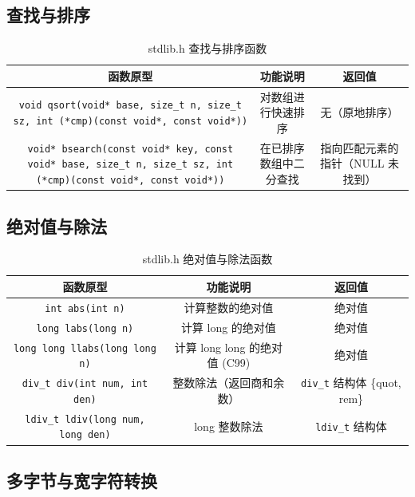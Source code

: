 \subsection{查找与排序}

\begin{table}[H]
\centering
\small
\renewcommand{\arraystretch}{1.6}
\begin{tabulary}{\linewidth}{CCC}
\toprule
\textbf{函数原型} & \textbf{功能说明} & \textbf{返回值} \\ \midrule
\texttt{void qsort(void* base, size\_t n, size\_t sz, int (*cmp)(const void*, const void*))} & 对数组进行快速排序 & 无（原地排序） \\ 
\texttt{void* bsearch(const void* key, const void* base, size\_t n, size\_t sz, int (*cmp)(const void*, const void*))} & 在已排序数组中二分查找 & 指向匹配元素的指针（NULL 未找到） \\ \bottomrule
\end{tabulary}
\caption{stdlib.h 查找与排序函数}
\label{tab:stdlib_search}
\end{table}

\subsection{绝对值与除法}

\begin{table}[H]
\centering
\small
\renewcommand{\arraystretch}{1.5}
\begin{tabulary}{\linewidth}{CCC}
\toprule
\textbf{函数原型} & \textbf{功能说明} & \textbf{返回值} \\ \midrule
\texttt{int abs(int n)} & 计算整数的绝对值 & 绝对值 \\ 
\texttt{long labs(long n)} & 计算 long 的绝对值 & 绝对值 \\ 
\texttt{long long llabs(long long n)} & 计算 long long 的绝对值 (C99) & 绝对值 \\ 
\texttt{div\_t div(int num, int den)} & 整数除法（返回商和余数） & \texttt{div\_t} 结构体 \{quot, rem\} \\ 
\texttt{ldiv\_t ldiv(long num, long den)} & long 整数除法 & \texttt{ldiv\_t} 结构体 \\ \bottomrule
\end{tabulary}
\caption{stdlib.h 绝对值与除法函数}
\label{tab:stdlib_math}
\end{table}

\subsection{多字节与宽字符转换}

